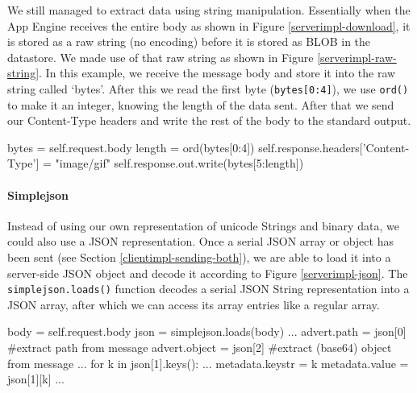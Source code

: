 We still managed to extract data using string manipulation. Essentially when the
App Engine receives the entire body as shown in Figure \ref{serverimpl-download},
it is stored as a raw string (no encoding) before it is stored as BLOB in the
datastore. We made use of that raw string as shown in Figure
\ref{serverimpl-raw-string}. In this example, we receive the message body and
store it into the raw string called `bytes'. After this we read the first byte
(\texttt{bytes[0:4]}), we use \texttt{ord()} to make it an integer, knowing the
length of the data sent. After that we send our Content-Type headers and write
the rest of the body to the standard output.

\begin{figure*}[ht] %
\begin{center}
\begin{code}
bytes = self.request.body
length = ord(bytes[0:4])
self.response.headers['Content-Type'] = "image/gif"
self.response.out.write(bytes[5:length])
\end{code}
\caption{Manipulating a Raw String.\label{serverimpl-raw-string}}
\end{center}
\end{figure*}

\paragraph{Simplejson}
\label{serverimpl-simplejson}
Instead of using our own representation of unicode Strings and binary data, we
could also use a JSON representation. Once a serial JSON array or object has
been sent (see Section \ref{clientimpl-sending-both}), we are able to load it
into a server-side JSON object and decode it according to Figure
\ref{serverimpl-json}. The \texttt{simplejson.loads()} function decodes a
serial JSON String representation into a JSON array, after which we can access
its array entries like a regular array. 

\begin{figure*}[ht] %
\begin{center}
\begin{code}
body = self.request.body
json = simplejson.loads(body)
...
advert.path   = json[0] #extract path from message
advert.object = json[2] #extract (base64) object from message
...
for k in json[1].keys():
  ...
  metadata.keystr = k
  metadata.value  = json[1][k]
...
\end{code}
\caption{Decoding a JSON object.\label{serverimpl-json}}
\end{center}
\end{figure*}

